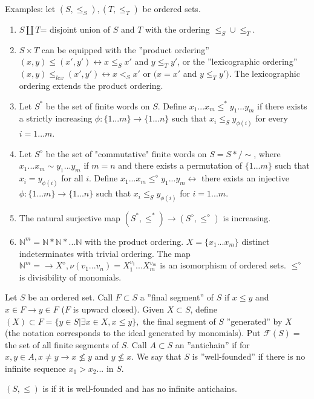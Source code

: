 Examples: let $(S, \leq_S), (T, \leq_T)$ be ordered sets.
\begin{enumerate}
  \item $S \coprod T$= disjoint union of $S$ and $T$ with the ordering $\leq_S \cup \leq_T$.
  \item $S \times T$ can be equipped with the ''product ordering'' $(x,y)\leq(x',y') \leftrightarrow x \leq_S x'$ and $y \leq_T y'$, or the ''lexicographic ordering'' $(x,y) \leq_{lex} (x',y') \leftrightarrow x <_S x'$ or $(x=x'$ and $y \leq_T y')$. The lexicographic ordering extends the product ordering.
  \item Let $S^*$ be the set of finite words on $S$. Define $x_{1}...x_{m} \leq^{*} y_{1}...y_{m}$ if there exists a strictly increasing $\phi: \{1...m\} \rightarrow \{1...n\}$ such that $x_i \leq_S y_{\phi(i)}$ for every $i=1...m$.
  \item Let $S^\diamond$ be the set of "commutative" finite words on $S=S*/ \sim$, where $x_{1}...x_{m} \sim y_{1}...y_{m}$ if $m=n$ and there exists a permutation of $\{1...m\}$ such that $x_i = y_{\phi(i)}$ for all $i$. Define  $x_{1}...x_{m} \leq^{\diamond} y_{1}...y_{m} \leftrightarrow$ there exists an injective $\phi: \{1...m\} \rightarrow \{1...n\}$ such that $x_i \leq_S y_{\phi(i)}$ for $i=1...m$.
  \item The natural surjective map $(S^*, \leq^*) \rightarrow (S^\diamond, \leq^\diamond)$ is increasing.
  \item $\mathbb{N}^m=\mathbb{N} * \mathbb{N} * ...\mathbb{N}$ with the product ordering. $X=\{x_1...x_m\}$ distinct indeterminates with trivial ordering. The map $\mathbb{N}^m= \rightarrow X^\diamond, \nu(v_1...v_n)=X_{1}^{v_1}...X_{m}^{v_m}$ is an isomorphism of ordered sets. $\leq^\diamond$ is divisibility of monomials.
\end{enumerate}

\WikiSigleStar Let $S$ be an ordered set. Call $F \subset S$ a ''final segment'' of $S$ if $x \leq y$ and $x \in F \rightarrow y \in F$ ($F$ is upward closed). Given $X \subset S$, define $(X) \subset F = \{y \in S|\exists x \in X, x \leq y\},$ the final segment of $S$ ''generated'' by $X$ (the notation corresponds to the ideal generated by monomials). Put $\mathcal{F}(S)=$ the set of all finite segments of $S$. Call $A \subset S$ an ''antichain'' if for $x, y \in A, x \neq y \rightarrow x \not\leq y$ and $y \not\leq x$. We say that $S$ is ''well-founded'' if there is no infinite sequence $x_{1}>x_{2}...$ in $S$.

\begin{definition} %
$(S, \leq)$ is  if it is well-founded and has no infinite antichains.
 \end{definition}


